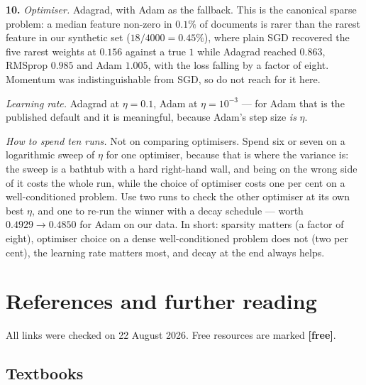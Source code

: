 \documentclass[11pt]{article}
\begin{document}
\medskip
\textbf{10.} \emph{Optimiser.} Adagrad, with Adam as the fallback. This is the canonical
sparse problem: a median feature non-zero in $0.1\%$ of documents is rarer than
the rarest feature in our synthetic set ($18/4000 = 0.45\%$), where plain SGD
recovered the five rarest weights at $0.156$ against a true $1$ while Adagrad
reached $0.863$, RMSprop $0.985$ and Adam $1.005$, with the loss falling by a
factor of eight. Momentum was indistinguishable from SGD, so do not reach for
it here.

\emph{Learning rate.} Adagrad at $\eta = 0.1$, Adam at $\eta = 10^{-3}$ --- for
Adam that is the published default and it is meaningful, because Adam's step
size \emph{is} $\eta$.

\emph{How to spend ten runs.} Not on comparing optimisers. Spend six or seven
on a logarithmic sweep of $\eta$ for one optimiser, because that is where the
variance is: the sweep is a bathtub with a hard right-hand wall, and being on
the wrong side of it costs the whole run, while the choice of optimiser costs
one per cent on a well-conditioned problem. Use two runs to check the other
optimiser at its own best $\eta$, and one to re-run the winner with a decay
schedule --- worth $0.4929 \to 0.4850$ for Adam on our data. In short: sparsity
matters (a factor of eight), optimiser choice on a dense well-conditioned
problem does not (two per cent), the learning rate matters most, and decay at
the end always helps.

\newpage
\section{References and further reading}

All links were checked on 22 August 2026. Free resources are marked
\textbf{[free]}.

\subsection*{Textbooks}
\end{document}
